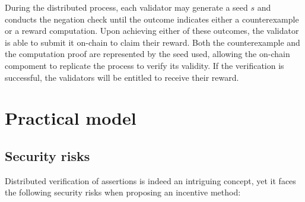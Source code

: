 \documentclass[runningheads]{llncs}
\begin{document}
During the distributed process, each validator may generate a seed $s$ and conducts the negation check until the outcome indicates either a counterexample or a reward computation. Upon achieving either of these outcomes, the validator is able to submit it on-chain to claim their reward. Both the counterexample and the computation proof are represented by the seed used, allowing the on-chain compoment to replicate the process to verify its validity. If the verification is successful, the validators will be entitled to receive their reward.
 









\section{Practical model}
\subsection{Security risks}
Distributed verification of assertions is indeed an intriguing concept, yet it faces the following security risks when proposing an incentive method:
\end{document}
